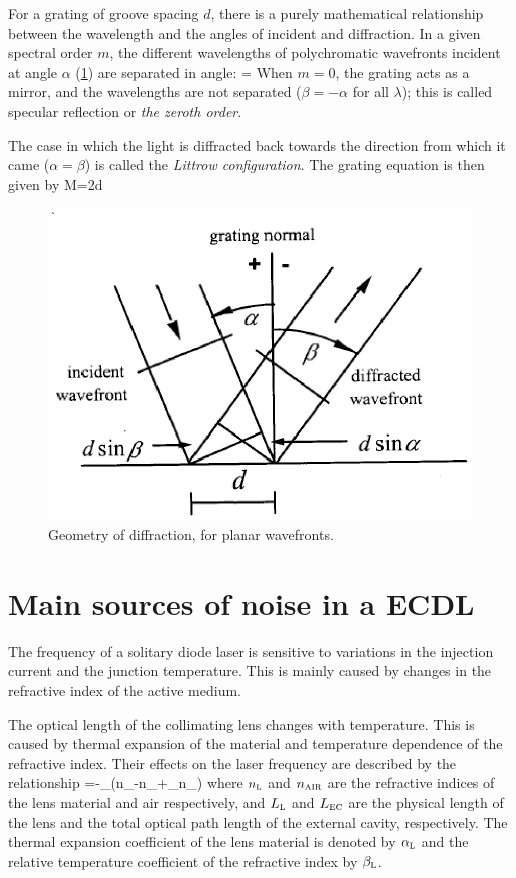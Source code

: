For a grating of groove spacing $d$, there is a purely mathematical relationship between the wavelength and the angles of incident and diffraction. In a given spectral order $m$, the different wavelengths of polychromatic wavefronts incident at angle $\alpha$ (\cref{littrow4}) are separated in angle:
\mate
\beta[\lambda]=\arcsin{}
\atem
When $m=0$, the grating acts as a mirror, and the wavelengths are not separated ($\beta=-\alpha$ for all $\lambda$); this is called specular reflection or \textit{the zeroth order}. 

The case in which the light is diffracted back towards the direction from which it came ($\alpha=\beta$) is called the \textit{Littrow configuration}. The grating equation is then given by
\mate
M\lambda=2d\sin\alpha
\atem
\begin{figure}[!htb]\centering
\includegraphics[width=\linewidth, draft=\foto]{eps/littrow4.eps}
\caption{Geometry of diffraction, for planar wavefronts.}
\label{littrow4}
\end{figure}

	\section{Main sources of noise in a ECDL}
The frequency of a solitary diode laser is sensitive to variations in the injection current and the junction temperature. This is mainly caused by changes in the refractive index of the active medium.

The optical length of the collimating lens changes with temperature. This is caused by thermal expansion of the material and temperature dependence of the refractive index. Their effects on the laser frequency are described by the relationship 
\mate
{}=-\nu{}\alpha_{}\left(n_{}-n_{}+\beta_{}n_{}\right)
\label{effect1}
\atem
where $n_{\mbox{\footnotesize{\scshape{l}}}}$ and $n_{\mbox{\footnotesize{\scshape{air}}}}$ are the refractive indices of the lens material and air respectively, and $L_{\mbox{\footnotesize{\scshape{l}}}}$ and $L_{\mbox{\footnotesize{\scshape{ec}}}}$ are the physical length of the lens and the total optical path length of the external cavity, respectively. The thermal expansion coefficient of the lens material is denoted by $\alpha_{\mbox{\footnotesize{\scshape{l}}}}$ and the relative temperature coefficient of the refractive index by $\beta_{\mbox{\footnotesize{\scshape{l}}}}$. 

